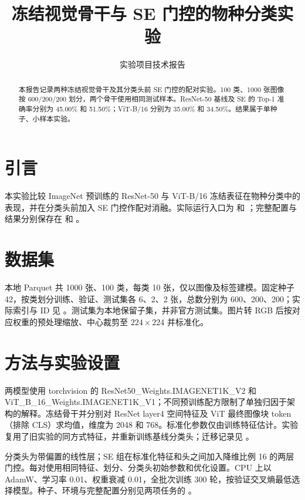 \documentclass[sigconf,balance=false]{acmart}
\begin{document}
\title{冻结视觉骨干与 SE 门控的物种分类实验}
\author{实验项目技术报告}
\begin{abstract}
本报告记录两种冻结视觉骨干及其分类头前 SE 门控的配对实验。100 类、1000 张图像按 600/200/200 划分，两个骨干使用相同测试样本。ResNet-50 基线及 SE 的 Top-1 准确率分别为 45.00\% 和 51.50\%；ViT-B/16 分别为 35.00\% 和 34.50\%。结果属于单种子、小样本实验。
\end{abstract}
\maketitle
\pagestyle{plain}
\suppressfloats[t]


\section{引言}
本实验比较 ImageNet 预训练的 ResNet-50 与 ViT-B/16 冻结表征在物种分类中的表现，并在分类头前加入 SE 门控作配对消融。实际运行入口为  和 ；完整配置与结果分别保存在  和 。

\section{数据集}
本地 Parquet 共 1000 张、100 类，每类 10 张，仅以图像及标签建模。固定种子 42，按类划分训练、验证、测试集各 6、2、2 张，总数分别为 600、200、200；实际索引与 ID 见 。测试集为本地保留子集，并非官方测试集。图片转 RGB 后按对应权重的预处理缩放、中心裁剪至 $224\times224$ 并标准化。

\section{方法与实验设置}
两模型使用 torchvision 的 ResNet50\_Weights.IMAGENET1K\_V2 和 ViT\_B\_16\_Weights.IMAGENET1K\_V1；不同预训练配方限制了单独归因于架构的解释。冻结骨干并分别对 ResNet layer4 空间特征及 ViT 最终图像块 token（排除 CLS）求均值，维度为 2048 和 768。标准化参数仅由训练特征估计。实验复用了旧实验的同方式特征，并重新训练基线分类头；迁移记录见 。

分类头为带偏置的线性层；SE 组在标准化特征和头之间加入降维比例 16 的两层门控。每对使用相同特征、划分、分类头初始参数和优化设置。CPU 上以 AdamW、学习率 0.01、权重衰减 0.01，全批次训练 300 轮，按验证交叉熵最低选择模型。种子、环境与完整配置分别见两项任务的 。
\end{document}
